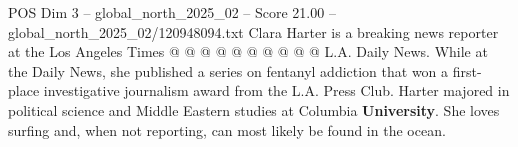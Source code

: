 \begin{textsample}{POS Dim 3 – global\_north\_2025\_02 – Score 21.00 – global\_north\_2025\_02/120948094.txt}
Clara Harter is a breaking news reporter at the Los Angeles Times @ @ @ @ @ @ @ @ @ @ L.A.
Daily News.
While at the Daily News, she published a series on fentanyl addiction that won a first-place investigative journalism award from the L.A.
Press Club.
Harter majored in political science and Middle Eastern studies at Columbia \textbf{University}.
She loves surfing and, when not reporting, can most likely be found in the ocean.

\end{textsample}
